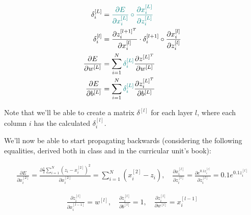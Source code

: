 \documentclass[12pt]{article}
\begin{document}
\begin{enumerate}[leftmargin=\labelsep]
        \begin{align*}
          \delta_i^{[L]}                      & = \textcolor{teal}{\frac{\partial E}{\partial x_i^{[L]}} \circ
          \frac{\partial x_i^{[L]}}{\partial z_i^{[L]}}}                                                                                   \\
          \delta_i^{[l]}                      & =
          \frac{\partial z_i^{[l + 1]^T}}{\partial x_i^{[l]}} \cdot \delta_i^{[l + 1]} \circ \frac{\partial x_i^{[l]}}{\partial z_i^{[l]}} \\
          \frac{\partial E}{\partial w^{[L]}} & = \sum_{i=1}^N \textcolor{teal}{\delta_i^{[L]}}
          \frac{\partial z^{[L]^T}}{\partial w^{[L]}}                                                                                      \\
          \frac{\partial E}{\partial b^{[L]}} & = \sum_{i=1}^N \textcolor{teal}{\delta_i^{[L]}}
          \frac{\partial z_i^{[L]^T}}{\partial b^{[L]}}
        \end{align*}

        Note that we'll be able to create a matrix $\delta^{[l]}$ for each
        layer $l$, where each column $i$ has the calculated $\delta_i^{[l]}$.

        We'll now be able to start propagating backwards (considering the following equalities,
        derived both in class and in the curricular unit's book):


        \begin{equation*}
          \begin{aligned}
            \frac{\partial E}{\partial x_i^{[2]}} = \frac{\partial \frac{1}{2}\sum_{i=1}^N (z_i - x_i^{[2]})^2}{\partial x_i^{[2]}} = \sum_{i=1}^N (x_i^{[2]} - z_i), \quad
            \frac{\partial x_i^{[l]}}{\partial z_i^{[l]}} = \frac{\partial e^{0.1z_i^{[l]}}}{\partial z_i^{[l]}} = 0.1e^{0.1z_i^{[l]}}
          \end{aligned}
        \end{equation*}

        \begin{equation*}
          \begin{aligned}
            \frac{\partial z_i^{[l]}}{\partial x_i^{[l - 1]}} = w^{[l]}, \quad
            \frac{\partial z_i^{[l]}}{\partial b^{[l]}} = 1, \quad
            \frac{\partial z_i^{[l]}}{\partial w^{[l]}} = x_i^{[l - 1]}
          \end{aligned}
        \end{equation*}


\end{enumerate}
\end{document}
